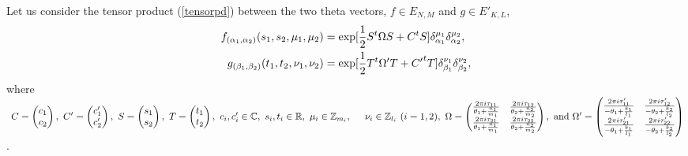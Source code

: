 \documentclass[12pt, a4paper]{article}
\newcommand{\Z}{{\mathbb Z}}
\newcommand{\R}{{\mathbb R}}
\newcommand{\C}{{\mathbb C}}
\begin{document}
Let us consider the tensor product (\ref{tensorpd}) between the
two theta vectors, $f\in E_{N,M}$ and $g \in E'_{K,L}$,
\begin{align} \label{thetat4p}
f_{(\alpha_1 , \alpha_2 )} (s_1 , s_2 , \mu_1, \mu_2 ) &= \exp [
\frac{1}{2} S^t \Omega S + C^t S ] \delta_{\alpha_1}^{\mu_1}
\delta_{\alpha_2}^{\mu_2}, \notag \\
g_{(\beta_1 , \beta_2 )} (t_1 , t_2 , \nu_1, \nu_2 ) &= \exp [
\frac{1}{2} T^t \Omega' T + {C'}^t T ] \delta_{\beta_1}^{\nu_1}
\delta_{\beta_2}^{\nu_2} ,
\end{align}
%
where $ \  C= \begin{pmatrix} c_1 \\ c_2 \end{pmatrix}, \  C'=
\begin{pmatrix} c'_1 \\ c'_2 \end{pmatrix}, \ S=\begin{pmatrix} s_1 \\
s_2 \end{pmatrix}, \ T=\begin{pmatrix} t_1 \\
t_2 \end{pmatrix}, \  c_i, c'_i \in \C, \  s_i,t_i \in \R, \
  \mu_i \in \Z_{m_i}, \\
\hspace*{.5cm}   \nu_i \in \Z_{l_i} \ (i=1,2), \
 \Omega =
\begin{pmatrix} \frac{2 \pi i \tau_{11} }{\theta_1 + \frac{n_1}{m_1}} &
\frac{2 \pi i \tau_{12} }{\theta_2 + \frac{n_2}{m_2}} \\
\frac{2 \pi i \tau_{21} }{\theta_1 + \frac{n_1}{m_1}} & \frac{2\pi
i \tau_{22} }{\theta_2 + \frac{n_2}{m_2}}
\end{pmatrix} , \ \text{and} \
\Omega' =
\begin{pmatrix} \frac{2 \pi i \tau'_{11} }{-\theta_1 + \frac{k_1}{l_1}} &
\frac{2 \pi i \tau'_{12} }{-\theta_2 + \frac{k_2}{l_2}} \\
\frac{2 \pi i \tau'_{21} }{-\theta_1 + \frac{k_1}{l_1}} &
\frac{2\pi i \tau'_{22} }{-\theta_2 + \frac{k_2}{l_2}}
\end{pmatrix}
$.
\\
\end{document}

